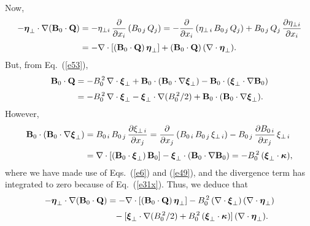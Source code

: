 \documentclass[12pt,prb,aps,notitlepage]{revtex4-1}
\newcommand{\bxi}{\mbox{\boldmath$\xi$}}
\newcommand{\bta}{\mbox{\boldmath$\eta$}}
\newcommand{\bkappa}{\mbox{\boldmath$\kappa$}}
\begin{document}
Now,
\begin{align}
-\bta_\perp\cdot\nabla ({\bf B}_0\cdot{\bf Q}) &= -\eta_{\perp i}\,\frac{\partial}{\partial x_i}\,(B_{0\,j}\,Q_j) = - \frac{\partial}{\partial x_i}\,(\eta_{\perp\,i}\,B_{0\,j}\,Q_j)+ B_{0\,j}\,Q_j\,\frac{\partial \eta_{\perp i}}{\partial x_i}\nonumber\\[0.5ex]
&= -\nabla\cdot[({\bf B}_0\cdot {\bf Q})\,\bta_\perp]  +({\bf B}_0\cdot{\bf Q})\,(\nabla\cdot\bta_\perp).
\end{align}
But, from Eq.~(\ref{e53}), 
\begin{align}
{\bf B}_0\cdot{\bf Q} &= - B_0^{\,2}\,\nabla\cdot\bxi_\perp + {\bf B}_0\cdot ({\bf B}_0\cdot\nabla\bxi_\perp) - {\bf B}_0\cdot
(\bxi_\perp\cdot\nabla {\bf B}_0)\nonumber\\[0.5ex]
&=- B_0^{\,2}\,\nabla\cdot\bxi_\perp - \bxi_\perp\cdot\nabla(B_0^{\,2}/2) + {\bf B}_0\cdot ({\bf B}_0\cdot\nabla\bxi_\perp).
\end{align}
However,
\begin{align}
 {\bf B}_0\cdot ({\bf B}_0\cdot\nabla\bxi_\perp) &= 
 B_{0\,i}\,B_{0\,j}\,\frac{\partial \xi_{\perp\,i}}{\partial x_j}= \frac{\partial}{\partial x_j}\,(B_{0\,i}\,B_{0\,j}\,\xi_{\perp\,i})- B_{0\,j} \,\frac{\partial B_{0\,i}}{\partial x_j}\,\xi_{\perp\,i}\nonumber\\[0.5ex]
 &= \nabla\cdot[({\bf B}_0\cdot\bxi_\perp)\,{\bf B}_0] - \bxi_\perp\cdot({\bf B}_0\cdot\nabla{\bf B}_0) = -B_0^{\,2}\,(\bxi_\perp\cdot\bkappa),
 \end{align}
 where we have made  use of Eqs.~(\ref{e6}) and (\ref{e49}), and the divergence term has  integrated to zero because of Eq.~(\ref{e31x}). 
 Thus, we deduce that
 \begin{align}\label{e60}
 -\bta_\perp\cdot\nabla ({\bf B}_0\cdot{\bf Q})& = -\nabla\cdot[({\bf B}_0\cdot {\bf Q})\,\bta_\perp]   -B_0^{\,2}\,(\nabla\cdot\bxi_\perp)\,(\nabla\cdot\bta_\perp)
 \nonumber\\[0.5ex]
 &\phantom{=}-[\bxi_\perp\cdot\nabla(B_0^{\,2}/2) + B_0^{\,2}\,(\bxi_\perp\cdot\bkappa)]\,(\nabla\cdot\bta_\perp).
 \end{align}
 
\end{document}
